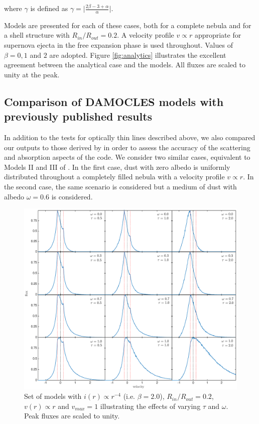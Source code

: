 \documentclass[useAMS,usenatbib,usegraphicx]{mnras}
\begin{document}
\noindent where $\gamma$ is defined as $\gamma= \lvert 
\frac{2\beta-3+\alpha}{\alpha} \rvert$.

Models are presented for each of these cases, both for a 
complete nebula and for a shell structure with $R_{in}/R_{out}=0.2$.  
A velocity profile $v \propto r$ appropriate for supernova ejecta in the free 
expansion phase is used throughout.  Values of $\beta = 0, 1$ and $2$ are 
adopted.  Figure \ref{fig:analytics} illustrates the excellent agreement between 
the analytical case and the models.  All fluxes are scaled to unity at the peak.

\subsection{Comparison of DAMOCLES models with previously published results}
\label{opt_thick_testing}



In addition to the tests for optically thin lines described above, we also 
compared our outputs to those derived by \citet{Lucy1989} in order to 
assess the accuracy of the scattering and absorption aspects of the code.  
We consider two similar cases, equivalent to Models II and III of 
\citet{Lucy1989}. In the first case, dust with zero albedo is 
uniformly distributed throughout a completely filled nebula with a velocity profile 
$v \propto r$.  In the second case, the same scenario is considered but a 
medium of dust with albedo $\omega =0.6$ is considered.

\begin{figure}
\includegraphics[trim =80 10 40 15,clip=true,scale=0.515]{params/C/C_all} 
\caption{Set of models with $i(r) \propto r^{-4}$ (i.e. $\beta=2.0$), $R_{in}/R_{out}=0.2$, $v(r) \propto r$  
and $v_{max}=1$ illustrating the effects of varying $\tau$ and $\omega$. 
Peak fluxes are scaled to unity.}
\label{wt}
\end{figure}
\end{document}
